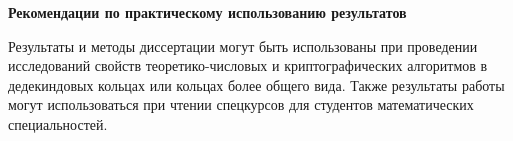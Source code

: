 \documentclass[_00_autoref.tex]{subfiles}
\begin{document}
\centerline{\textbf{Рекомендации по практическому использованию результатов}}

Результаты и методы диссертации могут быть использованы при проведении исследований свойств теоретико-числовых и криптографических алгоритмов в дедекиндовых кольцах или кольцах более общего вида.
Также результаты работы могут использоваться при чтении спецкурсов для студентов математических специальностей.
\end{document}
